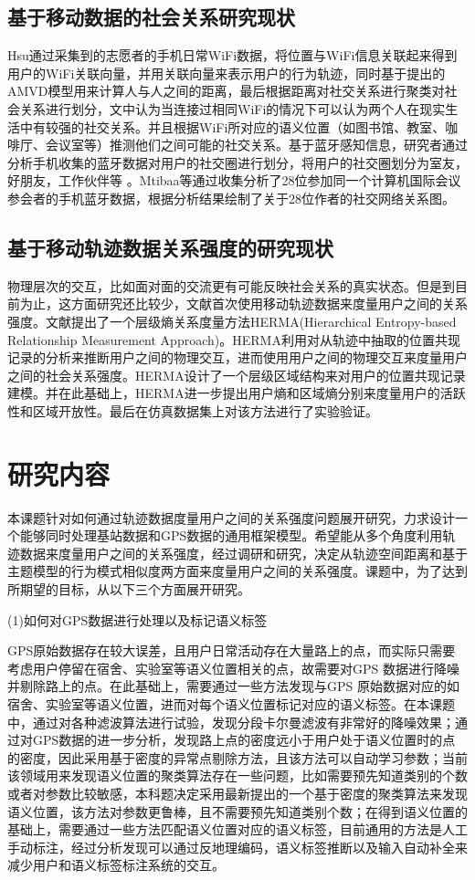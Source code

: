 \subsection{基于移动数据的社会关系研究现状}
Hsu通过采集到的志愿者的手机日常WiFi数据，将位置与WiFi信息关联起来得到用户的WiFi关联向量，并用关联向量来表示用户的行为轨迹，同时基于提出的AMVD模型用来计算人与人之间的距离，最后根据距离对社交关系进行聚类对社会关系进行划分，文中认为当连接过相同WiFi的情况下可以认为两个人在现实生活中有较强的社交关系。并且根据WiFi所对应的语义位置（如图书馆、教室、咖啡厅、会议室等）推测他们之间可能的社交关系。基于蓝牙感知信息，研究者通过分析手机收集的蓝牙数据对用户的社交圈进行划分，将用户的社交圈划分为室友，好朋友，工作伙伴等
。Mtibaa等通过收集分析了28位参加同一个计算机国际会议参会者的手机蓝牙数据，根据分析结果绘制了关于28位作者的社交网络关系图。
\subsection{基于移动轨迹数据关系强度的研究现状}
物理层次的交互，比如面对面的交流更有可能反映社会关系的真实状态。但是到目前为止，这方面研究还比较少，文献\cite{ma2014effective}首次使用移动轨迹数据来度量用户之间的关系强度。文献\cite{ma2014effective}提出了一个层级熵关系度量方法HERMA(Hierarchical Entropy-based Relationship Measurement Approach)。HERMA利用对从轨迹中抽取的位置共现记录的分析来推断用户之间的物理交互，进而使用用户之间的物理交互来度量用户之间的社会关系强度。HERMA设计了一个层级区域结构来对用户的位置共现记录建模。并在此基础上，HERMA进一步提出用户熵和区域熵分别来度量用户的活跃性和区域开放性。最后在仿真数据集上对该方法进行了实验验证。

\section{研究内容}
本课题针对如何通过轨迹数据度量用户之间的关系强度问题展开研究，力求设计一个能够同时处理基站数据和GPS数据的通用框架模型。希望能从多个角度利用轨迹数据来度量用户之间的关系强度，经过调研和研究，决定从轨迹空间距离和基于主题模型的行为模式相似度两方面来度量用户之间的关系强度。课题中，为了达到所期望的目标，从以下三个方面展开研究。
\par (1)如何对GPS数据进行处理以及标记语义标签
\par GPS原始数据存在较大误差，且用户日常活动存在大量路上的点，而实际只需要考虑用户停留在宿舍、实验室等语义位置相关的点，故需要对GPS 数据进行降噪并剔除路上的点。在此基础上，需要通过一些方法发现与GPS 原始数据对应的如宿舍、实验室等语义位置，进而对每个语义位置标记对应的语义标签。在本课题中，通过对各种滤波算法进行试验，发现分段卡尔曼滤波有非常好的降噪效果；通过对GPS数据的进一步分析，发现路上点的密度远小于用户处于语义位置时的点的密度，因此采用基于密度的异常点剔除方法，且该方法可以自动学习参数；当前该领域用来发现语义位置的聚类算法存在一些问题，比如需要预先知道类别的个数或者对参数比较敏感，本科题决定采用最新提出的一个基于密度的聚类算法来发现语义位置，该方法对参数更鲁棒，且不需要预先知道类别个数；在得到语义位置的基础上，需要通过一些方法匹配语义位置对应的语义标签，目前通用的方法是人工手动标注，经过分析发现可以通过反地理编码，语义标签推断以及输入自动补全来减少用户和语义标签标注系统的交互。


